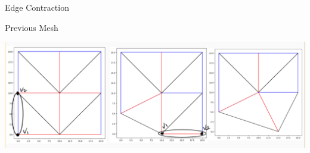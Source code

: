 %
\begin{frame}{Edge Contraction}
    \begin{center}
        Previous Mesh
    \end{center}
    \begin{center}
         \includegraphics[scale=0.17]{images/testdata.jpg}
         
         
    \end{center}
   

\end{frame}
